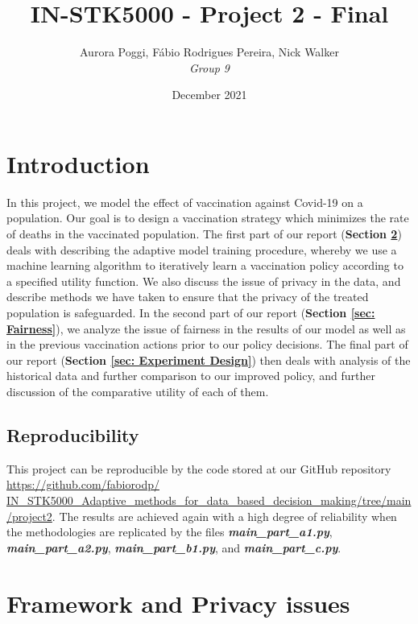 \documentclass{article}
\title{IN-STK5000 - Project 2 - Final}
\author{Aurora Poggi, Fábio Rodrigues Pereira, Nick Walker \\
\emph{Group 9}}
\date{December 2021}
\begin{document}
\maketitle

\tableofcontents

\clearpage

\section{Introduction}
\label{sec: Introduction}
In this project, we model the effect of vaccination against Covid-19 on a population. Our goal is to design a vaccination strategy which minimizes the rate of deaths in the vaccinated population. The first part of our report (\textbf{Section \ref{sec: Framework and Privacy issues}}) deals with describing the adaptive model training procedure, whereby we use a machine learning algorithm to iteratively learn a vaccination policy according to a specified utility function. We also discuss the issue of privacy in the data, and describe methods we have taken to ensure that the privacy of the treated population is safeguarded. In the second part of our report (\textbf{Section \ref{sec: Fairness}}), we analyze the issue of fairness in the results of our model as well as in the previous vaccination actions prior to our policy decisions. The final part of our report (\textbf{Section \ref{sec: Experiment Design}}) then deals with analysis of the historical data and further comparison to our improved policy, and further discussion of the comparative utility of each of them.

\subsection{Reproducibility}
\label{sec: Reproducibility}
This project can be reproducible by the code stored at our GitHub repository \href{https://github.com/fabiorodp/IN_STK5000_Adaptive_methods_for_data_based_decision_making/tree/main/project2}{https://github.com/fabiorodp/ IN\_STK5000\_Adaptive\_methods\_for\_data\_based\_decision\_making/tree/main/project2}. The results are achieved again with a high degree of reliability when the methodologies are replicated by the files
\textbf{\textit{main\_part\_a1.py}}, \textbf{\textit{main\_part\_a2.py}}, \textbf{\textit{main\_part\_b1.py}}, and \textbf{\textit{main\_part\_c.py}}.

\section{Framework and Privacy issues}
\label{sec: Framework and Privacy issues}
\end{document}
